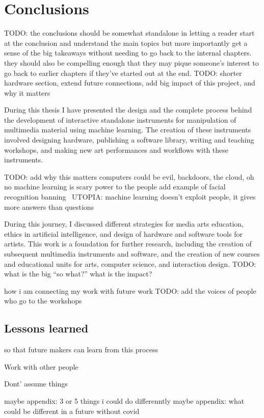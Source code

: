 \chapter{Conclusions}

TODO: the conclusions should be somewhat standalone in letting a reader start at the conclusion and understand the main topics but more importantly get a sense of the big takeaways without needing to go back to the internal chapters. they should also be compelling enough that they may pique someone's interest to go back to earlier chapters if they've started out at the end.
TODO: shorter hardware section, extend future connections, add big impact of this project, and why it matters

During this thesis I have presented the design and the complete process behind the development of interactive standalone instruments for manipulation of multimedia material using machine learning. The creation of these instruments involved designing hardware, publishing a software library, writing and teaching workshops, and making new art performances and workflows with these instruments.

TODO: add why this matters
computers could be evil, backdoors, the cloud, oh no
machine learning is scary
power to the people
add example of facial recognition banning~
UTOPIA: machine learning doesn’t exploit people, it gives more answers than questions


During this journey, I discussed different strategies for media arts education, ethics in artificial intelligence, and design of hardware and software tools for artists. This work is a foundation for further research, including the creation of subsequent multimedia instruments and software, and the creation of new courses and educational units for arts, computer science, and interaction design.
TODO: what is the big “so what?” what is the impact?

how i am connecting my work with future work
TODO: add the voices of people who go to the workshops~

\section{Lessons learned}

so that future makers can learn from this process

Work with other people

Dont’ assume things

maybe appendix: 3 or 5 things i could do differenntly
maybe appendix: what could be different in a future without covid

